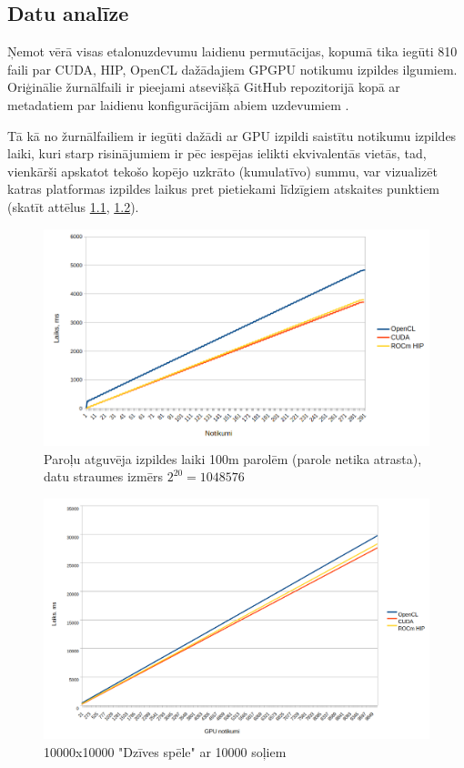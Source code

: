 \begin{center}
    \chapter{Datu analīze}
\end{center}

Ņemot vērā visas etalonuzdevumu laidienu permutācijas, kopumā tika iegūti 810
faili par CUDA, HIP, OpenCL dažādajiem GPGPU notikumu izpildes ilgumiem.
Oriģinālie žurnālfaili ir pieejami atsevišķā GitHub repozitorijā kopā
ar metadatiem par laidienu konfigurācijām abiem uzdevumiem
\cite{bak_github_repo_log}.

Tā kā no žurnālfailiem ir iegūti dažādi ar GPU izpildi saistītu notikumu
izpildes laiki, kuri starp risinājumiem ir pēc iespējas ielikti ekvivalentās
vietās, tad, vienkārši apskatot tekošo kopējo uzkrāto (kumulatīvo) summu,
var vizualizēt katras platformas izpildes laikus pret pietiekami
līdzīgiem atskaites punktiem (skatīt attēlus \ref{img:sha256_100m_not_found_cum},
\ref{img:gol_10k10k_10k_steps_cum}).

\begin{figure}[H]
    \centering
    \includegraphics[width=\textwidth]{images/sha256_100m_not_found.png}
    \caption{Paroļu atguvēja izpildes laiki 100m parolēm (parole netika
    atrasta), datu straumes izmērs \( 2^{20} = 1048576\)}
    \label{img:sha256_100m_not_found_cum}
\end{figure}

\begin{figure}[H]
    \centering
    \includegraphics[width=\textwidth]{images/gol_10k_by_10k_10ksteps.png}
    \caption{10000x10000 "Dzīves spēle" ar 10000 soļiem}
    \label{img:gol_10k10k_10k_steps_cum}
\end{figure}

